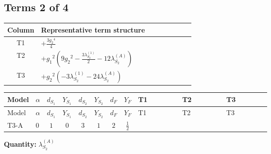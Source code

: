 \documentclass[8pt]{article}
\begin{document}
\begin{landscape}
\subsection*{Terms 2 of 4}
\begin{center}
\begin{tabular}{@{}c >{\raggedright\arraybackslash}p{0.82\linewidth}@{}}
\toprule
Column & Representative term structure \\
\midrule
T1 & \(\displaystyle +\frac{3 {g_2}^4}{4}\) \\
\midrule
T2 & \(\displaystyle +{g_1}^2 \left(9 {g_2}^2-\frac{3 {\lambda_{S_2}^{(1)}}}{2}-12 {\lambda_{S_2}^{(A)}}\right)\) \\
\midrule
T3 & \(\displaystyle +{g_2}^2 (-3 {\lambda_{S_2}^{(1)}}-24 {\lambda_{S_2}^{(A)}})\) \\
\midrule
\bottomrule
\end{tabular}
\end{center}
\smallskip
\tiny
\begin{longtable}{@{}llcccccc >{\raggedright\arraybackslash}p{0.21\linewidth} >{\raggedright\arraybackslash}p{0.21\linewidth} >{\raggedright\arraybackslash}p{0.21\linewidth}@{}}
\toprule
Model & $\alpha$ & $d_{S_1}$ & $Y_{S_1}$ & $d_{S_2}$ & $Y_{S_2}$ & $d_F$ & $Y_F$ & T1 & T2 & T3 \\
\midrule
\endfirsthead
\toprule
Model & $\alpha$ & $d_{S_1}$ & $Y_{S_1}$ & $d_{S_2}$ & $Y_{S_2}$ & $d_F$ & $Y_F$ & T1 & T2 & T3 \\
\midrule
\endhead
T3-A & $0$ & $1$ & $0$ & $3$ & $1$ & $2$ & $\frac{1}{2}$ & \scriptsize\adjustbox{max width=\linewidth}{$\begin{gathered} +\frac{3 {g_2}^4}{4}\end{gathered}$} & \scriptsize\adjustbox{max width=\linewidth}{$\begin{gathered} +{g_1}^2 \left(9 {g_2}^2-\frac{3 {\lambda_{S_2}^{(1)}}}{2}-12 {\lambda_{S_2}^{(A)}}\right)\end{gathered}$} & \scriptsize\adjustbox{max width=\linewidth}{$\begin{gathered} +{g_2}^2 (-3 {\lambda_{S_2}^{(1)}}-24 {\lambda_{S_2}^{(A)}})\end{gathered}$} \\
\midrule
\bottomrule
\end{longtable}
\clearpage
\noindent\textbf{Quantity: }$\lambda_{S_2}^{(A)}$\par\smallskip

\end{landscape}
\end{document}
